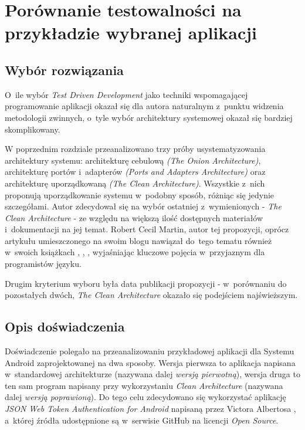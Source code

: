 \chapter{Porównanie testowalności \newline na przykładzie wybranej aplikacji}
\label{analiza_testow}

\section{Wybór rozwiązania}
\label{wybor_rozwiazania}
O~ile wybór \textit{Test Driven Development} jako techniki wspomagającej programowanie aplikacji okazał się dla autora naturalnym z~punktu widzenia metodologii zwinnych, o~tyle wybór architektury systemowej okazał się bardziej skomplikowany. 

W poprzednim rozdziale przeanalizowano trzy próby usystematyzowania architektury systemu: architekturę cebulową \textit{(The Onion Architecture)}, architekturę portów i~adapterów \textit{(Ports and Adapters Architecture)} oraz architekturę uporządkowaną \textit{(The Clean Architecture)}. Wszystkie z~nich proponują uporządkowanie systemu w~podobny sposób, różniąc się jedynie szczegółami. Autor zdecydował się na wybór ostatniej z~wymienionych - \textit{The Clean Architecture} - ze względu na większą ilość dostępnych materiałów i~dokumentacji na jej temat. Robert Cecil Martin, autor tej propozycji, oprócz artykułu umieszczonego na swoim blogu nawiązał do~tego tematu również w~swoich książkach \cite{bib:cecil:clean_code}, \cite{bib:cecil:the_clean_coder}, \cite{bib:cecil:agile}, wyjaśniając kluczowe pojęcia w~przyjaznym dla programistów języku. 

Drugim kryterium wyboru była data publikacji propozycji - w~porównaniu do pozostałych dwóch, \textit{The Clean Architecture} okazało się podejściem najświeższym.

\section{Opis doświadczenia}
Doświadczenie polegało na przeanalizowaniu przykładowej aplikacji dla Systemu Android zaprojektowanej na dwa sposoby. Wersja pierwsza to aplikacja napisana w~standardowej architekturze (nazywana dalej \textit{wersją pierwotną}), wersja druga to ten sam program napisany przy wykorzystaniu \textit{Clean Architecture} (nazywana dalej \textit{wersją poprawioną}). Do tego celu zdecydowano się wykorzystać
aplikację \textit{JSON Web Token Authentication for Android} napisaną przez Victora Albertosa \cite{website:victor:aplication}, a~której źródła udostępnione są w~serwisie GitHub na licencji \textit{Open Source}.

